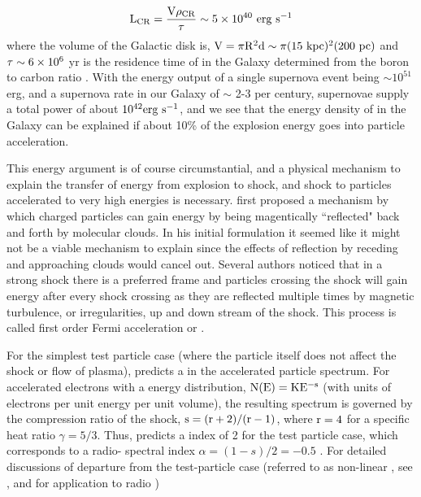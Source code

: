 \begin{equation}\label{eq:crLum}
\rm {L_{CR} = \frac{V\rho_{CR}}{\tau} \sim 5\times 10^{40}~erg~s^{-1}}
\end{equation}
where the volume of the Galactic disk is, ${\rm V = \pi R^2 d \sim  \pi (15~kpc)^2(200~pc)}$ and ${\rm \tau \sim 6\times 10^6}$ yr is the residence time of \crs{} in the Galaxy determined from the boron to carbon ratio \citep{Gaisser90}. With the energy output of a single supernova event being $\sim 10^{51}$ erg, and a supernova rate in our Galaxy of $\sim$ 2-3 per century, supernovae supply a total power of about ${\rm 10^{42} erg~s^{-1}}$, and we see that the energy density of \crs{} in the Galaxy can be explained if about 10\% of the explosion energy goes into particle acceleration.

This energy argument is of course circumstantial, and a physical mechanism to explain the transfer of energy from explosion to shock, and shock to particles accelerated to very high energies is necessary. \cite{Fermi49} first proposed a mechanism by which charged particles can  gain energy by being magentically ``reflected" back and forth by molecular clouds. In his initial formulation it seemed like it might not be a viable mechanism to explain \crs{} since the effects of reflection by receding and approaching clouds would cancel out. Several authors \citep[for example]{Bell78,Blandford78} noticed that in a strong shock there is a preferred frame and particles crossing the shock will gain energy after every shock crossing as they are reflected multiple times by magnetic turbulence, or irregularities, up and down stream of the shock. This process is called first order Fermi acceleration or \dsa{}.

For the simplest test particle case (where the particle itself does not affect the shock or flow of plasma), \dsa{} predicts a \pl{} in the accelerated particle spectrum. For accelerated electrons with a \pl{} energy distribution, ${\rm N(E) = KE^{-s}}$ (with units of electrons per unit energy per unit volume), the resulting \sync{} spectrum is governed by the compression ratio of the shock, ${\rm s = (r+2)/(r-1)} $, where ${\rm r = 4}$ for a specific heat ratio $\gamma = 5/3$\cite{}. Thus, \dsa{} predicts a \pl{} index of 2 for the test particle case, which corresponds to a radio-\sync{} spectral index $\alpha = (1-s)/2 = -0.5$   \citep[and Chapter \ref{gamAstr:Emiss} ]{Pacholczyk70}. For detailed discussions of departure from the test-particle case (referred to as non-linear \dsa{}, see \cite{Reynolds08},\cite{Malkov01} and \cite{Urosevic14} for application to radio \snrs{})

